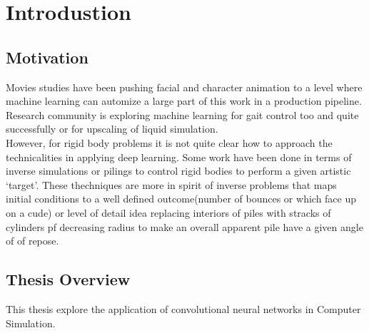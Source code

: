 \chapter{Introdustion}

\section{Motivation}
    Movies studies have been pushing facial and character animation to a level where machine learning can  automize a large part of this work in a production pipeline. Research community is exploring machine learning for gait control too and quite successfully or for upscaling of liquid simulation\cite{CNNFluid2016}. \\

    However, for rigid body problems it is not quite clear how to approach the technicalities in applying deep learning. Some work have been done in terms of inverse simulations or pilings to control rigid bodies to perform a given artistic `target'. These thechniques are more in spirit of inverse problems that maps initial conditions to a well defined outcome(number of bounces or which face up on a cude) or level of detail idea replacing interiors of piles with stracks of cylinders pf decreasing radius to make an overall apparent pile have a given angle of of repose.

\section{Thesis Overview}

    This thesis explore the application of convolutional neural networks in Computer Simulation. 